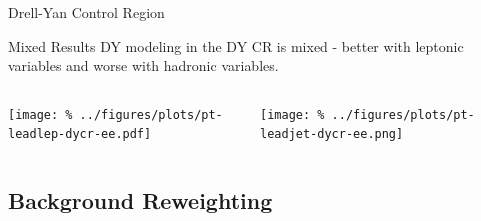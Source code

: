 \documentclass[aspectratio=169]{beamer}
\begin{document}
\begin{frame}{Drell-Yan Control Region}
  \begin{block}{Mixed Results}
    DY modeling in the DY CR is mixed - better with leptonic variables and worse with hadronic variables.
  \end{block}
  \vfill
  \begin{columns}
    \begin{column}{0.35\textwidth}
      \texttt{[image: \%
        ../figures/plots/pt-leadlep-dycr-ee.pdf]}
    \end{column}
    \begin{column}{0.35\textwidth}
      \texttt{[image: \%
        ../figures/plots/pt-leadjet-dycr-ee.png]}
    \end{column}
    \begin{column}{0.3\textwidth}
      \centering
      \resizebox{\columnwidth}{!}{%
      }
    \end{column}
  \end{columns}
\end{frame}

\subsection{Background Reweighting}
\end{document}
